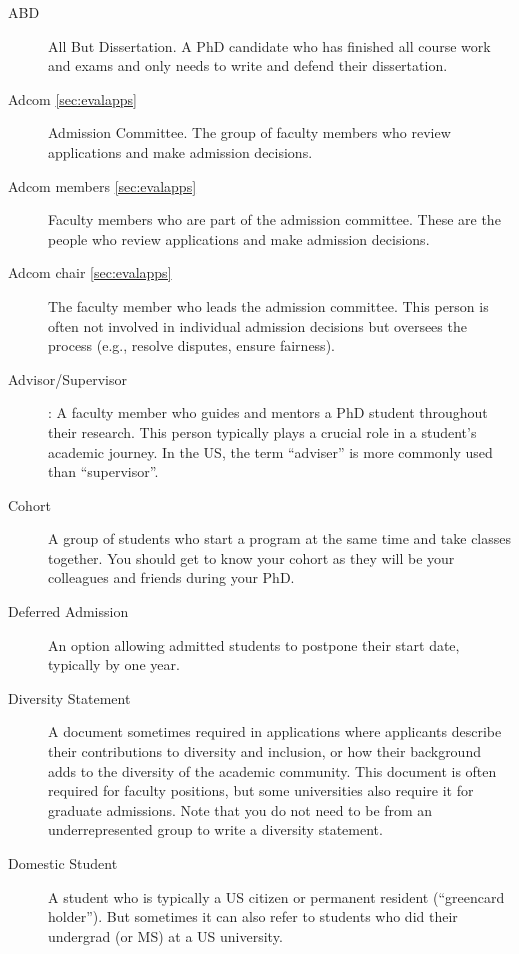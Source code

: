 \documentclass[oneside,11pt,dvipsnames]{book}
\begin{document}
\begin{description}

  \item[ABD] All But Dissertation. A PhD candidate who has finished all course work and exams and only needs to write and defend their dissertation.

  \item[Adcom \autoref{sec:evalapps}] Admission Committee. The group of faculty members who review applications and make admission decisions.
  
  \item [Adcom members \autoref{sec:evalapps}] Faculty members who are part of the admission committee. These are the people who review applications and make admission decisions.
  
  \item[Adcom chair \autoref{sec:evalapps}] The faculty member who leads the admission committee. This person is often not involved in individual admission decisions but oversees the process (e.g., resolve disputes, ensure fairness).
  
  \item[Advisor/Supervisor]: A faculty member who guides and mentors a PhD student throughout their research. This person typically plays a crucial role in a student's academic journey. In the US, the term ``adviser'' is more commonly used than ``supervisor''.
  
  \item[Cohort] A group of students who start a program at the same time and take classes together. You should get to know your cohort as they will be your colleagues and friends during your PhD.
  
  \item [Deferred Admission] An option allowing admitted students to postpone their start date, typically by one year.
  \item [Diversity Statement] A document sometimes required in applications where applicants describe their contributions to diversity and inclusion, or how their background adds to the diversity of the academic community. This document is often required for faculty positions, but some universities also require it for graduate admissions. Note that you do not need to be from an underrepresented group to write a diversity statement.
  
  \item[Domestic Student] A student who is typically a US citizen or permanent resident (``greencard holder'').
        But sometimes it can also refer to students who did their undergrad (or MS) at a US university.


\end{description}
\end{document}
